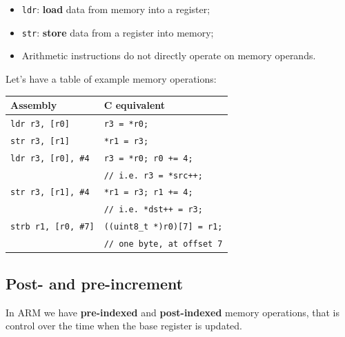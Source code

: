 \documentclass[a4paper,11pt]{article}
\begin{document}
\begin{itemize}
	\item \texttt{ldr}: \textbf{load} data from memory into a register;
	\item \texttt{str}: \textbf{store} data from a register into memory;
	\item Arithmetic instructions do not directly operate on memory operands.
\end{itemize}

Let's have a table of example memory operations:
\begin{table}[H]
	\centering
	\begin{tabular}{ll}
		\hline
		Assembly                    & C equivalent                      \\
		\hline
		\texttt{ldr r3, [r0]}       &
		\texttt{r3 = *r0;}                                              \\

		\texttt{str r3, [r1]}       &
		\texttt{*r1 = r3;}                                              \\

		\texttt{ldr r3, [r0], \#4}  &
		\texttt{r3 = *r0; r0 += 4;}                                     \\
		                            & \texttt{// i.e. r3 = *src++;}     \\

		\texttt{str r3, [r1], \#4}  &
		\texttt{*r1 = r3; r1 += 4;}                                     \\
		                            & \texttt{// i.e. *dst++ = r3;}     \\

		\texttt{strb r1, [r0, \#7]} &
		\texttt{((uint8\_t *)r0)[7] = r1;}                              \\
		                            & \texttt{// one byte, at offset 7} \\
		\hline
	\end{tabular}
\end{table}

\subsection{Post- and pre-increment}

In ARM we have \textbf{pre-indexed} and \textbf{post-indexed} memory operations, that is control over the time when the base register is updated.
\end{document}
